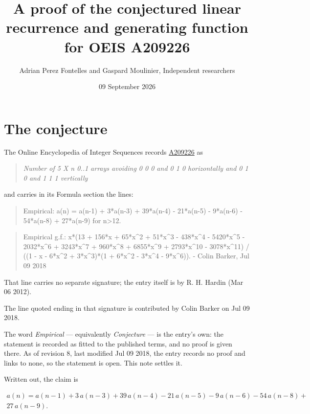\documentclass[11pt]{article}
\title{A proof of the conjectured linear recurrence and generating function for OEIS A209226}
\author{Adrian Perez Fontelles and Gaspard Moulinier, Independent researchers}
\date{09 September 2026}
\theoremstyle{definition}
\begin{document}
\maketitle
\section{The conjecture}

The Online Encyclopedia of Integer Sequences records \href{https://oeis.org/A209226}{A209226} as

\begin{quote}\itshape Number of 5 X n 0..1 arrays avoiding 0 0 0 and 0 1 0 horizontally and 0 1 0 and 1 1 1 vertically\end{quote}

and carries in its Formula section the lines:

\begin{quote}\ttfamily Empirical: a(n) = a(n-1) + 3*a(n-3) + 39*a(n-4) - 21*a(n-5) - 9*a(n-6) - 54*a(n-8) + 27*a(n-9) for n>12.\end{quote}

\begin{quote}\ttfamily Empirical g.f.: x*(13 + 156*x + 65*x\textasciicircum{}2 + 51*x\textasciicircum{}3 - 438*x\textasciicircum{}4 - 5420*x\textasciicircum{}5 - 2032*x\textasciicircum{}6 + 3243*x\textasciicircum{}7 + 960*x\textasciicircum{}8 + 6855*x\textasciicircum{}9 + 2793*x\textasciicircum{}10 - 3078*x\textasciicircum{}11) / ((1 - x - 6*x\textasciicircum{}2 + 3*x\textasciicircum{}3)*(1 + 6*x\textasciicircum{}2 - 3*x\textasciicircum{}4 - 9*x\textasciicircum{}6)). - Colin Barker, Jul 09 2018\end{quote}

That line carries no separate signature; the entry itself is by R. H. Hardin (Mar 06 2012).

The line quoted ending in that signature is contributed by Colin Barker on Jul 09 2018.

The word {\itshape Empirical} --- equivalently {\itshape Conjecture} --- is the entry's own: the statement is recorded as fitted to the published terms, and no proof is given there. As of revision 8, last modified Jul 09 2018, the entry records no proof and links to none, so the statement is open. This note settles it.

Written out, the claim is

\begin{multline*} a(n) = a(n-1) + 3\,a(n-3) + 39\,a(n-4) - 21\,a(n-5) - 9\,a(n-6) - 54\,a(n-8) + \\ 27\,a(n-9). \end{multline*}
\end{document}
